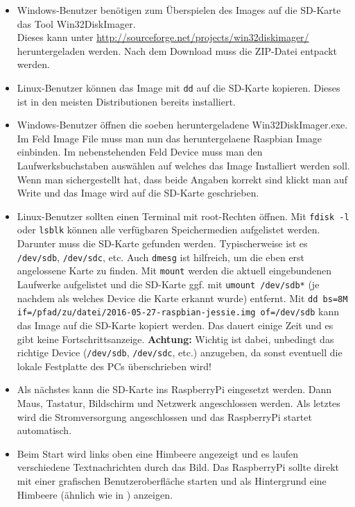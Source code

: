 \begin{itemize}
	\item {Windows-Benutzer benötigen zum Überspielen des Images auf die SD-Karte das Tool Win32DiskImager.\\
		Dieses kann unter \url{http://sourceforge.net/projects/win32diskimager/} heruntergeladen werden. 
		Nach dem Download muss die ZIP-Datei entpackt werden.
		}
	\item {Linux-Benutzer können das Image mit \lstinline|dd| auf die SD-Karte kopieren. Dieses ist in den meisten Distributionen bereits installiert.
		}
	\item {Windows-Benutzer öffnen die soeben heruntergeladene Win32DiskImager.exe. Im Feld Image File muss man nun das heruntergelaene Raspbian Image einbinden. 
		Im nebenstehenden Feld Device muss man den Laufwerksbuchstaben auswählen auf welches das Image Installiert werden soll. 
		Wenn man sichergestellt hat, dass beide Angaben korrekt sind klickt man auf Write und das Image wird auf die SD-Karte geschrieben.
		}
	\item {Linux-Benutzer sollten einen Terminal mit root-Rechten öffnen. 
		Mit \lstinline|fdisk -l| oder \lstinline|lsblk| können alle verfügbaren Speichermedien aufgelistet werden. Darunter muss die SD-Karte gefunden werden.
		Typischerweise ist es \lstinline|/dev/sdb|, \lstinline|/dev/sdc|, etc.
		Auch \lstinline|dmesg| ist hilfreich, um die eben erst angelossene Karte zu finden. 
		Mit \lstinline|mount| werden die aktuell eingebundenen Laufwerke aufgelistet und 
		die SD-Karte ggf. mit \lstinline|umount /dev/sdb*| (je nachdem als welches Device die Karte erkannt wurde) entfernt.
		Mit \lstinline|dd bs=8M if=/pfad/zu/datei/2016-05-27-raspbian-jessie.img of=/dev/sdb| kann das Image auf die SD-Karte kopiert werden.
		Das dauert einige Zeit und es gibt keine Fortschrittsanzeige.
		\textbf{Achtung:} Wichtig ist dabei, unbedingt das richtige Device (\lstinline|/dev/sdb|, \lstinline|/dev/sdc|, etc.) anzugeben, 
		da sonst eventuell die lokale Festplatte des PCs überschrieben wird!
		}
	\item {Als nächstes kann die SD-Karte ins RaspberryPi eingesetzt werden. Dann Maus, Tastatur, Bildschirm und Netzwerk angeschlossen werden. 
		Als letztes wird die Stromversorgung angeschlossen und das RaspberryPi startet automatisch.
		}
	\item {Beim Start wird links oben eine Himbeere angezeigt und es laufen verschiedene Textnachrichten durch das Bild. 
		Das RaspberryPi sollte direkt mit einer grafischen Benutzeroberfläche starten und als Hintergrund eine Himbeere (ähnlich wie in ) anzeigen.
}
\end{itemize}
